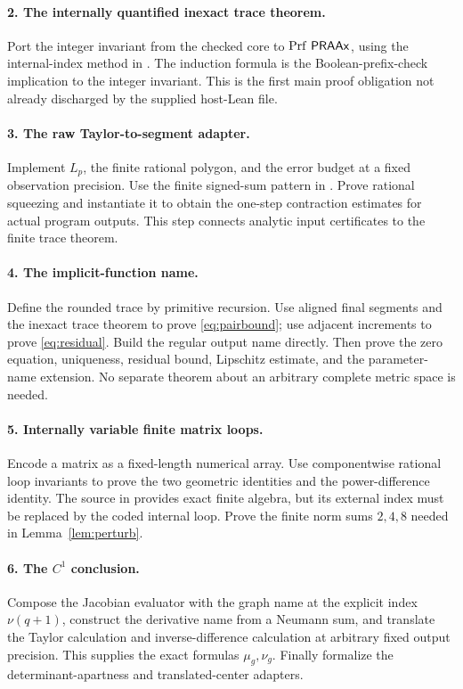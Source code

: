 \paragraph{2. The internally quantified inexact trace theorem.}
Port the integer invariant from the checked core to
\(\operatorname{Prf}\,\mathsf{PRAAx}\), using the internal-index method in
. The induction formula is the
Boolean-prefix-check implication to the integer
invariant. This is the first main proof obligation
not already discharged by the supplied host-Lean file.

\paragraph{3. The raw Taylor-to-segment adapter.}
Implement \(L_p\), the finite rational polygon, and
the error budget at a fixed observation precision.
Use the finite signed-sum pattern in .
Prove rational squeezing and instantiate it to obtain
the one-step contraction estimates for actual program
outputs. This step connects analytic input certificates
to the finite trace theorem.

\paragraph{4. The implicit-function name.}
Define the rounded trace by primitive recursion.
Use aligned final segments and the inexact trace
theorem to prove \eqref{eq:pairbound}; use adjacent
increments to prove \eqref{eq:residual}.
Build the regular output name directly. Then prove
the zero equation, uniqueness, residual bound,
Lipschitz estimate, and the parameter-name extension.
No separate theorem about an arbitrary complete
metric space is needed.

\paragraph{5. Internally variable finite matrix loops.}
Encode a matrix as a fixed-length numerical array.
Use componentwise rational loop invariants to prove
the two geometric identities and the power-difference
identity. The source in 
provides exact finite algebra, but its external index
must be replaced by the coded internal loop. Prove
the finite norm sums \(2,4,8\) needed in
Lemma~\ref{lem:perturb}.

\paragraph{6. The \(C^1\) conclusion.}
Compose the Jacobian evaluator with the graph name at
the explicit index \(\nu(q+1)\), construct the
derivative name from a Neumann sum, and translate the
Taylor calculation and inverse-difference calculation
at arbitrary fixed output precision. This supplies
the exact formulas \(\mu_g,\nu_g\). Finally formalize
the determinant-apartness and translated-center
adapters.

